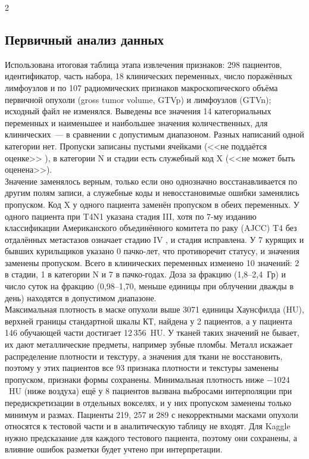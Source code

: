 \documentclass[11pt, a4paper]{article}
\begin{document}
\begin{multicols}{2}
\subsection*{Первичный анализ данных}

Использована итоговая таблица этапа извлечения признаков: 298 пациентов, идентификатор, часть набора, 18 клинических переменных, число поражённых лимфоузлов и по 107 радиомических признаков макроскопического объёма первичной опухоли (gross tumor volume, GTVp) и лимфоузлов (GTVn); исходный файл не изменялся. Выведены все значения 14 категориальных переменных и наименьшее и наибольшее значения количественных, для клинических~--- в сравнении с допустимым диапазоном. Разных написаний одной категории нет. Пропуски записаны пустыми ячейками (<<не поддаётся оценке>> \cite{Elhalawani2017}), в категории N и стадии есть служебный код X (<<не может быть оценена>>).\vspace{6pt}\\
Значение заменялось верным, только если оно однозначно восстанавливается по другим полям записи, а служебные коды и невосстановимые ошибки заменялись пропуском. Код X у одного пациента заменён пропуском в обеих переменных. У одного пациента при T4N1 указана стадия III, хотя по 7-му изданию классификации Американского объединённого комитета по раку (AJCC) T4 без отдалённых метастазов означает стадию IV \cite{Edge2010}, и стадия исправлена. У 7 курящих и бывших курильщиков указано 0 пачко-лет, что противоречит статусу, и значения заменены пропуском. Всего в клинических переменных изменено 10 значений: 2 в стадии, 1 в категории N и 7 в пачко-годах. Доза за фракцию (1,8--2,4~Гр) и число суток на фракцию (0,98--1,70, меньше единицы при облучении дважды в день) находятся в допустимом диапазоне.\vspace{6pt}\\
Максимальная плотность в маске опухоли выше 3071 единицы Хаунсфилда (HU), верхней границы стандартной шкалы КТ, найдена у 2 пациентов, а у пациента 146 обучающей части достигает 12\,356~HU. У тканей таких значений не бывает, их дают металлические предметы, например зубные пломбы. Металл искажает распределение плотности и текстуру, а значения для ткани не восстановить, поэтому у этих пациентов все 93 признака плотности и текстуры заменены пропуском, признаки формы сохранены. Минимальная плотность ниже $-1024$~HU (ниже воздуха) ещё у 8 пациентов вызвана выбросами интерполяции при передискретизации в отдельных вокселях, и у них пропуском заменены только минимум и размах. Пациенты 219, 257 и 289 с некорректными масками опухоли относятся к тестовой части и в аналитическую таблицу не входят. Для Kaggle нужно предсказание для каждого тестового пациента, поэтому они сохранены, а влияние ошибок разметки будет учтено при интерпретации.\vspace{6pt}\\

\end{multicols}
\end{document}
